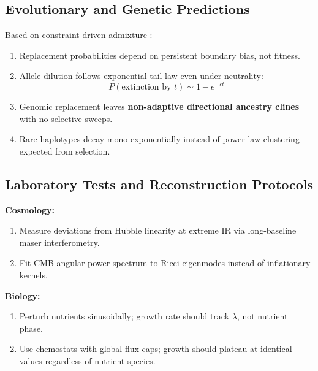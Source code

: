 \documentclass[11pt,a4paper]{article}
\begin{document}
\subsection{Evolutionary and Genetic Predictions}

Based on constraint-driven admixture \citep{Amadei2025}:

\begin{enumerate}
    \item Replacement probabilities depend on persistent boundary bias, not fitness.
    \item Allele dilution follows exponential tail law even under neutrality:
    \begin{equation}
    P(\text{extinction by } t) \sim 1 - e^{-\epsilon t}
    \end{equation}
    \item Genomic replacement leaves \textbf{non-adaptive directional ancestry clines} with no selective sweeps.
    \item Rare haplotypes decay mono-exponentially instead of power-law clustering expected from selection.
\end{enumerate}

\subsection{Laboratory Tests and Reconstruction Protocols}

\textbf{Cosmology:}

\begin{enumerate}
    \item Measure deviations from Hubble linearity at extreme IR via long-baseline maser interferometry.
    \item Fit CMB angular power spectrum to Ricci eigenmodes instead of inflationary kernels.
\end{enumerate}

\textbf{Biology:}

\begin{enumerate}
    \item Perturb nutrients sinusoidally; growth rate should track \(\lambda\), not nutrient phase.
    \item Use chemostats with global flux caps; growth should plateau at identical values regardless of nutrient species.
\end{enumerate}
\end{document}
